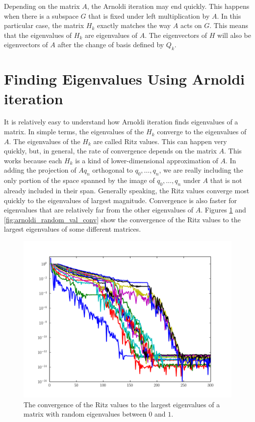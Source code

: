 \begin{info}
Depending on the matrix $A$, the Arnoldi iteration may end quickly.
This happens when there is a subspace $G$ that is fixed under left multiplication by $A$.
In this particular case, the matrix $H_k$ exactly matches the way $A$ acts on $G$.
This means that the eigenvalues of $H_k$ are eigenvalues of $A$.
The eigenvectors of $H$ will also be eigenvectors of $A$ after the change of basis defined by $Q_k$.
\end{info}


\section*{Finding Eigenvalues Using Arnoldi iteration}

It is relatively easy to understand how Arnoldi iteration finds eigenvalues of a matrix.
In simple terms, the eigenvalues of the $H_k$ converge to the eigenvalues of $A$.
The eigenvalues of the $H_k$ are called Ritz values.
This can happen very quickly, but, in general, the rate of convergence depends on the matrix $A$.
This works because each $H_k$ is a kind of lower-dimensional approximation of $A$.
In adding the projection of $A q_n$ orthogonal to $q_0, \ldots, q_n$, we are really including the only portion
of the space spanned by the image of $q_0, \dots, q_n$ under $A$ that is not already included in their span.
Generally speaking, the Ritz values converge most quickly to the eigenvalues of largest magnitude.
Convergence is also faster for eigenvalues that are relatively far from the other eigenvalues of $A$.
Figures \ref{fig:arnoldi_random_eig_conv} and \ref{fig:arnoldi_random_val_conv} show the convergence of the
Ritz values to the largest eigenvalues of some different matrices.

\begin{figure}
\includegraphics[width=\textwidth]{rand_eigs_conv.pdf}
\caption{The convergence of the Ritz values to the largest eigenvalues of a matrix with random eigenvalues between $0$ and $1$.}
\label{fig:arnoldi_random_eig_conv}
\end{figure}

